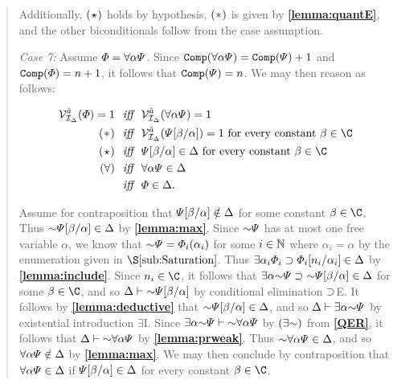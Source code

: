 \begin{quote}
  Additionally, $(\hspace{.7pt}\star\hspace{.7pt})$ holds by hypothesis, $(\hspace{.7pt}\ast\hspace{.7pt})$ is given by \textbf{\ref{lemma:quantE}}, and the other biconditionals follow from the case assumption.

  \textit{Case 7:}
  Assume $\varPhi=\forall \alpha\varPsi$.
  Since $\texttt{Comp}(\forall \alpha\varPsi)=\texttt{Comp}(\varPsi)+1$ and $\texttt{Comp}(\varPhi)=n+1$, it follows that $\texttt{Comp}(\varPsi)=n$.
  We may then reason as follows:

  \vspace{-.2in}
  \begin{align*}
    \VV{\I_\Delta}{\va{a}}(\metaA)=1 &\textit{ ~iff~ } \VV{\I_\Delta}{\va{a}}(\qt{\forall}{\alpha}\metaB)=1\\
      (\hspace{.7pt}\ast\hspace{.7pt}) &\textit{ ~iff~ } \VV{\I_\Delta}{\va{a}}(\metaB\unisub{\beta}{\alpha})=1 \text{ for every constant } \beta\in\C\\
      (\hspace{.7pt}\star\hspace{.7pt}) &\textit{ ~iff~ } \metaB\unisub{\beta}{\alpha}\in\Delta \text{ for every constant } \beta\in\C\\ 
      (\forall) &\textit{ ~iff~ } \qt{\forall}{\alpha}\metaB\in\Delta \\
      &\textit{ ~iff~ } \metaA\in\Delta.
  \end{align*}

  Assume for contraposition that $\varPsi[\beta/\alpha]\notin\Delta$ for some constant $\beta\in\C$.
  Thus $\enot\metaB\unisub{\beta}{\alpha}\in\Delta$ by \textbf{\ref{lemma:max}}.
  Since $\enot\metaB$ has at most one free variable $\alpha$, we know that $\enot\metaB=\metaA_i(\alpha_i)$ for some $i\in\mathbb{N}$ where $\alpha_i=\alpha$ by the enumeration given in $\S\ref{sub:Saturation}$.
  Thus $\exists \alpha_i\varPhi_i\supset\varPhi_i[n_i/\alpha_i]\in\Delta$ by \textbf{\ref{lemma:include}}.
  Since $n_i\in\C$, it follows that $\qt{\exists}{\alpha}\enot\metaB\eif\enot\metaB\unisub{\beta}{\alpha}\in\Delta$ for some $\beta\in\C$, and so $\Delta\proves\enot\metaB\unisub{\beta}{\alpha}$ by conditional elimination $\supset$E. 
  It follows by \textbf{\ref{lemma:deductive}} that $\enot\metaB\unisub{\beta}{\alpha}\in\Delta$, and so $\Delta\proves \qt{\exists}{\alpha}\enot\metaB$ by existential introduction $\exists$I. 
  Since $\qt{\exists}{\alpha}\enot\metaB\proves\enot\qt{\forall}{\alpha}\metaB$ by $(\exists\enot)$ from \textbf{\ref{QER}}, it follows that $\Delta\proves\enot \qt{\forall}{\alpha}\metaB$ by \textbf{\ref{lemma:prweak}}. 
  Thus $\enot\qt{\forall}{\alpha}\metaB\in\Delta$, and so $\forall \alpha\varPsi\notin\Delta$ by \textbf{\ref{lemma:max}}.
  We may then conclude by contraposition that $\forall \alpha\varPsi\in\Delta$ if $\varPsi[\beta/\alpha]\in\Delta$ for every constant $\beta\in\C$.


\end{quote}
